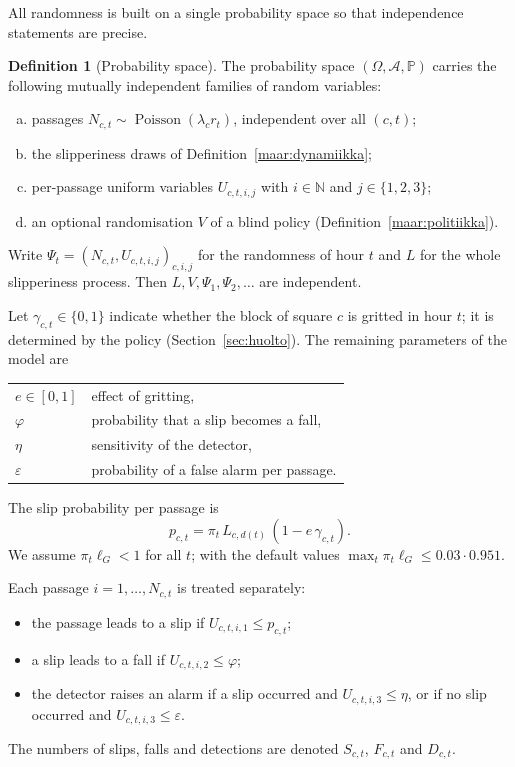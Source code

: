 \documentclass[11pt,a4paper]{article}
\theoremstyle{plain}
\theoremstyle{definition}
\newtheorem{maaritelma}{Definition}
\theoremstyle{remark}
\renewcommand{\P}{\mathbb{P}}
\newcommand{\cA}{\mathcal{A}}
\newcommand{\1}{\mathbf{1}}
\newcommand{\Poi}{\operatorname{Poisson}}
\begin{document}
All randomness is built on a single probability space so that independence
statements are precise.

\begin{maaritelma}[Probability space]\label{maar:avaruus}
The probability space $(\Omega, \cA, \P)$ carries the following mutually
independent families of random variables:
\begin{enumerate}[(a)]
  \item passages $N_{c,t} \sim \Poi(\lambda_c r_t)$, independent over all $(c,t)$;
  \item the slipperiness draws of Definition~\ref{maar:dynamiikka};
  \item per-passage uniform variables $U_{c,t,i,j}$ with $i \in \mathbb{N}$ and
  $j \in \{1, 2, 3\}$;
  \item an optional randomisation $V$ of a blind policy (Definition~\ref{maar:politiikka}).
\end{enumerate}
Write $\Psi_t = (N_{c,t}, U_{c,t,i,j})_{c, i, j}$ for the randomness of hour $t$
and $L$ for the whole slipperiness process. Then $L, V, \Psi_1, \Psi_2, \dots$ are
independent.
\end{maaritelma}

Let $\gamma_{c,t} \in \{0,1\}$ indicate whether the block of square $c$ is
gritted in hour $t$; it is determined by the policy (Section~\ref{sec:huolto}).
The remaining parameters of the model are
\begin{center}
\begin{tabular}{@{}ll@{}}
$e \in [0,1]$ & effect of gritting, \\
$\varphi$ & probability that a slip becomes a fall, \\
$\eta$ & sensitivity of the detector, \\
$\varepsilon$ & probability of a false alarm per passage.
\end{tabular}
\end{center}

The slip probability per passage is
\begin{equation}\label{eq:p}
  p_{c,t} = \pi_t\, L_{c,d(t)}\, (1 - e\,\gamma_{c,t}).
\end{equation}
We assume $\pi_t \ell_G < 1$ for all $t$; with the default values
$\max_t \pi_t \ell_G \le 0.03 \cdot 0.951$.

Each passage $i = 1, \dots, N_{c,t}$ is treated separately:
\begin{itemize}
  \item the passage leads to a slip if $U_{c,t,i,1} \le p_{c,t}$;
  \item a slip leads to a fall if $U_{c,t,i,2} \le \varphi$;
  \item the detector raises an alarm if a slip occurred and $U_{c,t,i,3} \le \eta$,
  or if no slip occurred and $U_{c,t,i,3} \le \varepsilon$.
\end{itemize}
The numbers of slips, falls and detections are denoted $S_{c,t}$, $F_{c,t}$ and
$D_{c,t}$.
\end{document}
